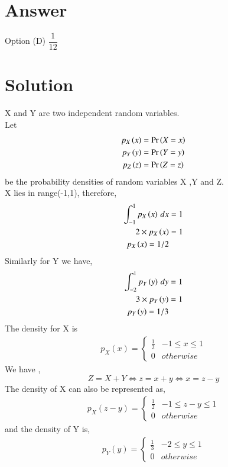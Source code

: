 \section{Answer}
Option (D) $\dfrac{1}{12}$
\section{Solution}
X and Y are two independent random variables. \\
Let
\begin{align}
    p_X\left(x\right) &= \Pr\left(X=x\right) \\
    p_Y\left(y\right) &= \Pr\left(Y=y\right)  \\
    p_Z\left(z\right) &= \Pr\left(Z=z\right)
\end{align}
be the probability densities of random variables X ,Y and Z. \\
X lies in range(-1,1), therefore,
\begin{align}
    \int_{-1}^{1} p_X\left(x\right) \,dx  &=1 \\
    2 \times p_X\left(x\right)  &= 1 \\
     p_X\left(x\right) =1 /2
\end{align}
Similarly for Y we have,
\begin{align}
    \int_{-2}^{1} p_Y\left(y\right) \,dy  &=1 \\
    3 \times p_Y\left(y\right)  &= 1  \\
     p_Y\left(y\right) =1 /3
\end{align}
The density for X is \\
\begin{align}
\label{eq:_pdf_x}
p_{X}(x)  = 
\begin{cases}
\frac{1}{2} & -1 \le x \le 1
\\
0 & otherwise
\end{cases}
\end{align}
We have ,
\begin{equation}
    Z= X+Y \iff z= x+ y \iff x = z-y
\end{equation}
The density of X can also be represented as,
\begin{align}
\label{eq:pdf_x}
p_{X}(z-y)  = 
\begin{cases}
\frac{1}{2} & -1 \le z-y \le 1
\\
0 & otherwise
\end{cases}
\end{align}
and the density of Y is,
\begin{align}
\label{eq:pdf_y}
p_{Y}(y)  = 
\begin{cases}
\frac{1}{3} & -2 \le y \le 1
\\
0 & otherwise
\end{cases}
\end{align}
